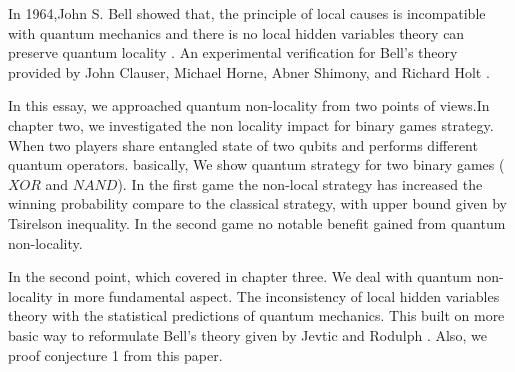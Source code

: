 In 1964,John S. Bell showed that, the principle of local causes is incompatible with quantum mechanics and there is no local hidden variables theory can preserve quantum locality \citep*{book:800289}. An experimental verification for Bell's theory provided by John Clauser, Michael Horne, Abner Shimony, and Richard Holt \cite*{PhysRevLett.23.880}.


In this essay, we approached quantum non-locality from two points of views.In chapter two, we investigated the non locality  impact for binary games strategy. When two  players share entangled state of two qubits and performs different quantum operators. basically, We show quantum strategy for two binary games ($XOR$ and $NAND$). In the first game the non-local strategy has increased the winning probability  compare to the classical strategy, with upper bound given by Tsirelson inequality\citep*{Cirel'son1980}. In the second game no notable benefit  gained from quantum non-locality.




In the second point, which covered in chapter three. We deal with quantum non-locality  in more fundamental aspect. The inconsistency of local hidden variables theory with the statistical predictions of quantum mechanics.
This built on more basic way to reformulate Bell's theory given by  Jevtic and Rodulph \citep*{Jevtic:2015:10.1364/JOSAB.32.000A50}. Also, we  proof conjecture 1  from this paper. 

